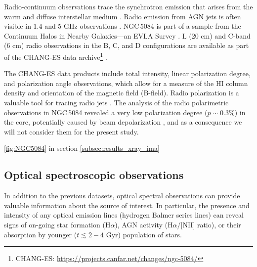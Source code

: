 \documentclass[modern]{CORE-AAS/aastex631}
\begin{document}
Radio-continuum observations trace the synchrotron emission that arises from the warm and diffuse interstellar medium \citep{beck+2013inbook_641}. Radio emission from AGN jets is often visible in 1.4 and 5 GHz observations \citep[20 cm and 6 cm]{sebastian+2019apj883_189, hardcastle+2020na88_101539}. NGC\,5084 is part of a sample from the Continuum Halos in Nearby Galaxies—an EVLA Survey \citep[CHANG-ES][]{irwin+2012aj144_43}. L (20 cm) and C-band (6 cm) radio observations in the B, C, and D configurations are available as part of the CHANG-ES data archive\footnote{CHANG-ES: \url{https://projects.canfar.net/changes/ngc-5084/}} \citep{wiegert+2015aj150_81, irwin+2019aj158_21}. 

The CHANG-ES data products include total intensity, linear polarization degree, and polarization angle observations, which allow for a measure of the HI column density and orientation of the magnetic field (B-field). Radio polarization is a valuable tool for tracing radio jets \citep{pasetto+2018aap613_74, sebastian+2020mnras499_334}. 
The analysis of the radio polarimetric observations in NGC\,5084 revealed a very low polarization degree ($p\sim0.3$\%) in the core, potentially caused by beam depolarization \citep{haverkorn+2004aap421_1011, pasetto+2018aap613_74}, and as a consequence we will not consider them for the present study.

\cite{pan+2019apj881_119}
\ref{fig:NGC5084} in section \ref{subsec:results_xray_ima}
\subsection{Optical spectroscopic observations} \label{subsec:data_optical_spectra}

In addition to the previous datasets, optical spectral observations can provide valuable information about the source of interest. In particular, the presence and intensity of any optical emission lines (hydrogen Balmer series lines) can reveal signs of on-going star formation (H$\alpha$), AGN activity (H$\alpha$/[NII] ratio), or their absorption by younger ($t\lesssim 2-4$ Gyr) population of stars. 
\end{document}
